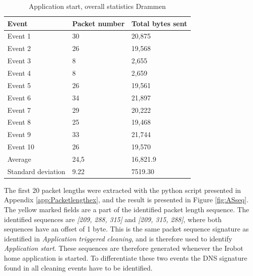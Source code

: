\begin{table}[H]
\centering
\caption{Application start, overall statistics Drammen}
\label{tab:ASoverallDRA}
\begin{tabular}{|l|l|l|}
\hline
\textbf{Event} & \textbf{Packet number} & \textbf{Total bytes sent} \\ \hline
Event 1        & 30                     & 20,875                     \\ \hline
Event 2        & 26                     & 19,568                     \\ \hline
Event 3        & 8                      & 2,655                      \\ \hline
Event 4        & 8                      & 2,659                      \\ \hline
Event 5        & 26                     & 19,561                     \\ \hline
Event 6        & 34                     & 21,897                     \\ \hline
Event 7        & 29                     & 20,222                     \\ \hline
Event 8        & 25                     & 19,468                     \\ \hline
Event 9        & 33                     & 21,744                     \\ \hline
Event 10       & 26                     & 19,570                     \\ \hline
Average        & 24,5                   & 16,821.9                   \\ \hline
Standard deviation        & 9.22
       & 7519.30               \\ \hline
\end{tabular}
\end{table}

The first 20 packet lengths were extracted with the python script presented in Appendix \ref{app:Packetlengthex}, and the result is presented in Figure \ref{fig:ASseq}. The yellow marked fields are a part of the identified packet length sequence. The identified sequences are \textit{[209, 288, 315]} and \textit{[209, 315, 288]}, where both sequences have an offset of 1 byte. This is the same packet sequence signature as identified in \textit{Application triggered cleaning}, and is therefore used to identify \textit{Application start}. These sequences are therefore generated whenever the Irobot home application is started. To differentiate these two events the DNS signature found in all cleaning events have to be identified.  

